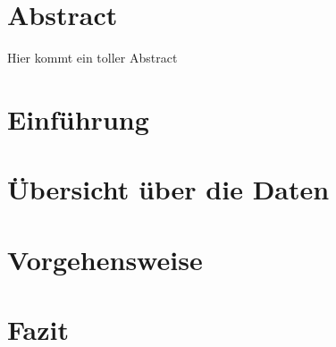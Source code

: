 \documentclass[
	titlepage=false,
	a4paper, %
	12pt, %
	twoside, %
	BCOR=5mm, %
	fleqn, %
	bibliography=totoc, %
	headinclude, %
	headsepline
]{scrreprt}
\begin{document}
	\renewcommand{\arraystretch}{1.15} %



	

	\pagestyle{headings}

	\chapter*{Abstract}
	Hier kommt ein toller Abstract

	\tableofcontents

	\chapter{Einführung}
	
	
	\chapter{Übersicht über die Daten}
	
	
	\chapter{Vorgehensweise}
	
	\chapter{Fazit}
	

	\newpage
	

	
\end{document}
